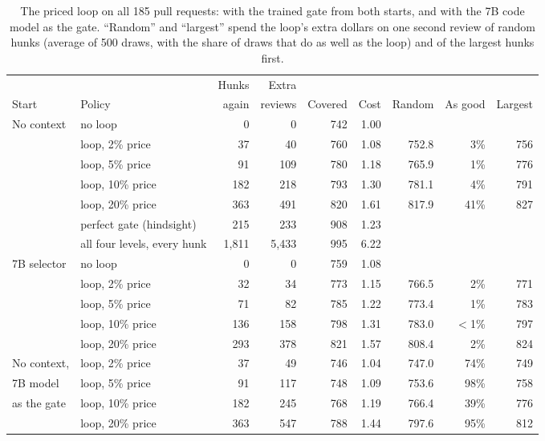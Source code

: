 \documentclass{article}
\begin{document}
\begin{table}[h]
\caption{The priced loop on all 185 pull requests: with the trained gate from both starts, and with the 7B code model as the gate. ``Random'' and ``largest'' spend the loop's extra dollars on one second review of random hunks (average of 500 draws, with the share of draws that do as well as the loop) and of the largest hunks first.}
\label{tab:loop}
\centering
\small
\setlength{\tabcolsep}{4pt}
\begin{tabular}{llrrrrrrr}
\toprule
 & & Hunks & Extra & & & & & \\
Start & Policy & again & reviews & Covered & Cost & Random & As good & Largest\\
\midrule
No context & no loop & 0 & 0 & 742 & 1.00 & & & \\
 & loop, 2\% price & 37 & 40 & 760 & 1.08 & 752.8 & 3\% & 756\\
 & loop, 5\% price & 91 & 109 & 780 & 1.18 & 765.9 & 1\% & 776\\
 & loop, 10\% price & 182 & 218 & 793 & 1.30 & 781.1 & 4\% & 791\\
 & loop, 20\% price & 363 & 491 & 820 & 1.61 & 817.9 & 41\% & 827\\
 & perfect gate (hindsight) & 215 & 233 & 908 & 1.23 & & & \\
 & all four levels, every hunk & 1,811 & 5,433 & 995 & 6.22 & & & \\
\midrule
7B selector & no loop & 0 & 0 & 759 & 1.08 & & & \\
 & loop, 2\% price & 32 & 34 & 773 & 1.15 & 766.5 & 2\% & 771\\
 & loop, 5\% price & 71 & 82 & 785 & 1.22 & 773.4 & 1\% & 783\\
 & loop, 10\% price & 136 & 158 & 798 & 1.31 & 783.0 & $<$1\% & 797\\
 & loop, 20\% price & 293 & 378 & 821 & 1.57 & 808.4 & 2\% & 824\\
\midrule
No context, & loop, 2\% price & 37 & 49 & 746 & 1.04 & 747.0 & 74\% & 749\\
7B model & loop, 5\% price & 91 & 117 & 748 & 1.09 & 753.6 & 98\% & 758\\
as the gate & loop, 10\% price & 182 & 245 & 768 & 1.19 & 766.4 & 39\% & 776\\
 & loop, 20\% price & 363 & 547 & 788 & 1.44 & 797.6 & 95\% & 812\\
\bottomrule
\end{tabular}
\end{table}
\end{document}
